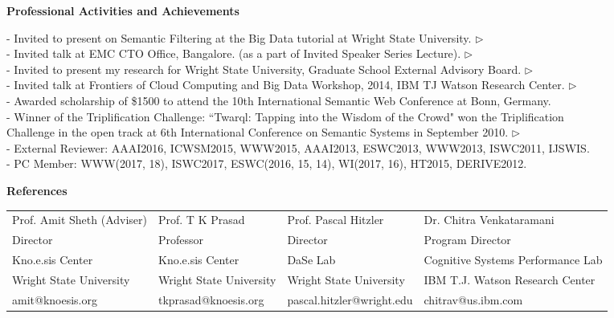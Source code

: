 \documentclass[letterpaper,9pt]{article}
\newcommand{\resheading}[1]{{\large \colorbox{mygrey}{\begin{minipage}{\textwidth}{\textbf{#1 \vphantom{p\^{E}}}}\end{minipage}}}}
\begin{document}
\resheading{Professional Activities and Achievements}
\vspace{0.0in}

- Invited to present on Semantic Filtering at the Big Data tutorial at Wright State University. \href{http://www.slideshare.net/pavankapanipathi/knoesissemantic-filteringtutorials}{$\triangleright$}\\ 
-  Invited talk at EMC CTO Office, Bangalore. (as a part of Invited Speaker Series Lecture). \href{http://www.slideshare.net/pavankapanipathi/emc-final2}{$\triangleright$}\\ 
-  Invited to present my research for Wright State University, Graduate School External Advisory Board. \href{http://www.slideshare.net/knoesis/pavan-knoesisresearchaccomplishmentsfinal}{$\triangleright$}\\
-  Invited talk at Frontiers of Cloud Computing and Big Data Workshop, 2014, IBM TJ Watson Research Center. \href{http://www.slideshare.net/knoesis/pavan-ibmaddressing-volume-and-velocity-challenge-on-the-socialfinal}{$\triangleright$}\\ 
-  Awarded scholarship of \$1500 to attend the 10th International Semantic Web Conference at Bonn, Germany. \\
-  Winner of the Triplification Challenge: ``Twarql: Tapping into the Wisdom of the Crowd" won the Triplification \\ \hspace{0.7em}Challenge in the open track at 6th International Conference on Semantic Systems in September 2010. \href{http://knoesis.org/library/resource.php?id=1104}{$\triangleright$}\\ 
-  External Reviewer: AAAI2016, ICWSM2015, WWW2015, AAAI2013, ESWC2013, WWW2013, ISWC2011, IJSWIS.\\
-  PC Member: WWW(2017, 18), ISWC2017, ESWC(2016, 15, 14), WI(2017, 16), HT2015, DERIVE2012.\\

\vspace{0.03in}

\resheading{References}
\vspace{0.03in}

\begin{tabular}{ p{4.5cm} p{4.5cm} p{4.5cm} p{6cm}}
  Prof. Amit Sheth (Adviser)  & Prof. T K Prasad & Prof. Pascal Hitzler & Dr. Chitra Venkataramani\\
  Director & Professor & Director & Program Director\\
  Kno.e.sis Center & Kno.e.sis Center & DaSe Lab & Cognitive Systems Performance Lab\\
  Wright State University &  Wright State University &  Wright State University & IBM T.J. Watson Research Center\\
  amit@knoesis.org & tkprasad@knoesis.org & pascal.hitzler@wright.edu & chitrav@us.ibm.com
\end{tabular}
\end{document}
